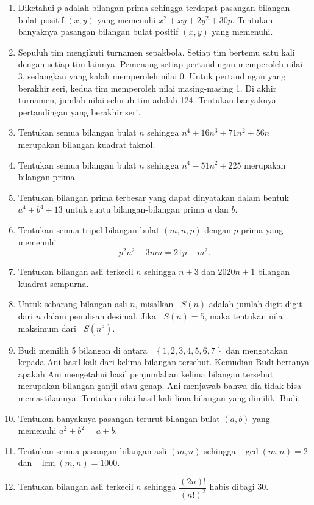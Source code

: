 \documentclass[12pt]{article}
\newcommand*\lrbr[1]{\mathop{}\!\left\lbrace#1\right\rbrace}
\newcommand*\func[2]{\mathop{}\!{#1}{\left({#2}\right)}}
\DeclareMathOperator{\lcm}{lcm}				%
\begin{document}
\begin{enumerate}[leftmargin=*]
		\item Diketahui $ p $ adalah bilangan prima sehingga terdapat pasangan bilangan bulat positif $ \left(x, y\right) $ yang memenuhi $ x^{2} + xy + 2y^{2} + 30p $. Tentukan banyaknya pasangan bilangan bulat positif $ \left(x, y\right) $ yang memenuhi.
		\item Sepuluh tim mengikuti turnamen sepakbola. Setiap tim bertemu satu kali dengan setiap tim lainnya. Pemenang setiap pertandingan memperoleh nilai 3, sedangkan yang kalah memperoleh nilai 0. Untuk pertandingan yang berakhir seri, kedua tim memperoleh nilai masing-masing 1. Di akhir turnamen, jumlah nilai seluruh tim adalah 124. Tentukan banyaknya pertandingan yang berakhir seri.
		\item Tentukan semua bilangan bulat $ n $ sehingga $ n^{4} + 16n^{3} + 71n^{2} + 56n $ merupakan bilangan kuadrat taknol.
		\item Tentukan semua bilangan bulat $ n $ sehingga $ n^{4} - 51n^{2} + 225 $ merupakan bilangan prima.
		\item Tentukan bilangan prima terbesar yang dapat dinyatakan dalam bentuk $ a^{4} + b^{4} + 13 $ untuk suatu bilangan-bilangan prima $ a $ dan $ b $.
		\item Tentukan semua tripel bilangan bulat $ \left(m, n, p\right) $ dengan $ p $ prima yang memenuhi
		\[ p^{2}n^{2} - 3mn = 21p - m^{2}. \]
		\item Tentukan bilangan asli terkecil $ n $ sehingga $ n + 3 $ dan $ 2020n + 1 $ bilangan kuadrat sempurna.
		\item Untuk sebarang bilangan asli $ n $, misalkan $ \func{S}{n} $ adalah jumlah digit-digit dari $ n $ dalam penulisan desimal. Jika $ \func{S}{n} = 5 $, maka tentukan nilai maksimum dari $ \func{S}{n^{5}} $.
		\item Budi memilih 5 bilangan di antara $ \lrbr{1, 2, 3, 4, 5, 6, 7} $ dan mengatakan kepada Ani hasil kali dari kelima bilangan tersebut. Kemudian Budi bertanya apakah Ani mengetahui hasil penjumlahan kelima bilangan tersebut merupakan bilangan ganjil atau genap. Ani menjawab bahwa dia tidak bisa memastikannya. Tentukan nilai hasil kali lima bilangan yang dimiliki Budi.
		\item Tentukan banyaknya pasangan terurut bilangan bulat $ \left(a, b\right) $ yang memenuhi $ a^{2} + b^{2} = a + b $.
		\item Tentukan semua pasangan bilangan asli $ \left(m, n\right) $ sehingga $ \func{\gcd}{m, n} = 2 $ dan $ \func{\lcm}{m, n} = 1000 $.
		\item Tentukan bilangan asli terkecil $ n $ sehingga $ \dfrac{\left(2n\right)!}{\left(n!\right)^{2}} $ habis dibagi 30.

\end{enumerate}
\end{document}
